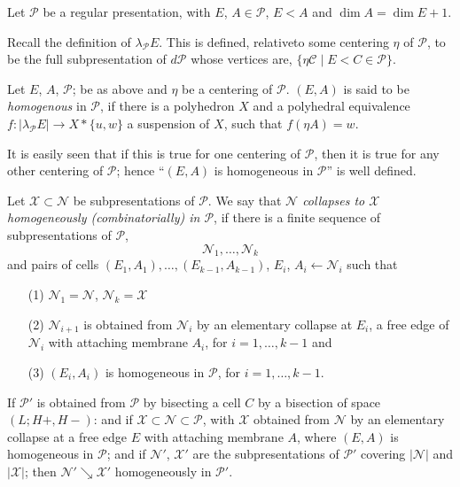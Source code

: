 Let $\mathscr{P}$ be a regular presentation, with $E$, $A\in \mathscr{P}$, $E<A$ and $\dim A=\dim E+1$.

\setcounter{pageoriginal}{144}
Recall the definition of $\lambda_{\mathscr{P}}E$. This is defined, relative\pageoriginale to some centering $\eta$ of $\mathscr{P}$, to be the full subpresentation of $d\mathscr{P}$ whose vertices are, $\{\eta \mathscr{C}\mid E<C\in\mathscr{P}\}$. 

\begin{definition}\label{chap6-defi6.7.1}
Let $E$, $A$, $\mathscr{P}$; be as above and $\eta$ be a centering of $\mathscr{P}$. $(E,A)$ is said to be {\em homogenous} in $\mathscr{P}$, if there is a polyhedron $X$ and a polyhedral equivalence $f:|\lambda_{\mathscr{P}}E|\to X\ast\{u,w\}$ a suspension of $X$, such that $f(\eta A)=w$.
\end{definition}

It is easily seen that if this is true for one centering of $\mathscr{P}$, then it is true for any other centering of $\mathscr{P}$; hence ``$(E,A)$ is homogeneous in $\mathscr{P}$'' is well defined.

\begin{definition}\label{chap6-defi6.7.2}
Let $\mathscr{X}\subset \mathscr{N}$ be subpresentations of $\mathscr{P}$. We say that {\em $\mathscr{N}$ collapses to $\mathscr{X}$ homogeneously (combinatorially) in $\mathscr{P}$}, if there is a finite sequence of subpresentations of $\mathscr{P}$,
$$
\mathscr{N}_{1},\ldots,\mathscr{N}_{k}
$$
and pairs of cells $(E_{1},A_{1}),\ldots,(E_{k-1},A_{k-1})$, $E_{i}$, $A_{i}\leftarrow \mathscr{N}_{i}$ such that 
\begin{itemize}
\item[(1)] $\mathscr{N}_{1}=\mathscr{N}$, $\mathscr{N}_{k}=\mathscr{X}$

\item[(2)] $\mathscr{N}_{i+1}$ is obtained from $\mathscr{N}_{i}$ by an elementary collapse at $E_{i}$, a free edge of $\mathscr{N}_{i}$ with attaching membrane $A_{i}$, for $i=1,\ldots,k-1$ and

\item[(3)] $(E_{i},A_{i})$ is homogeneous in $\mathscr{P}$, for $i=1,\ldots,k-1$. 
\end{itemize}
\end{definition}

\begin{proposition}\label{chap6-prop6.7.3}
If $\mathscr{P}'$ is obtained from $\mathscr{P}$ by bisecting a cell $C$ by a bisection of space $(L;H+,H-)$: and if $\mathscr{X}\subset \mathscr{N}\subset \mathscr{P}$, with $\mathscr{X}$ obtained from $\mathscr{N}$ by an elementary collapse at a free edge $E$ with attaching membrane $A$, where $(E,A)$ is homogeneous in $\mathscr{P}$; and if $\mathscr{N}'$, $\mathscr{X}'$ are the subpresentations of $\mathscr{P}'$ covering $|\mathscr{N}|$ and\pageoriginale $|\mathscr{X}|$; then $\mathscr{N}'\searrow \mathscr{X}'$ homogeneously in $\mathscr{P}'$.
\end{proposition}

